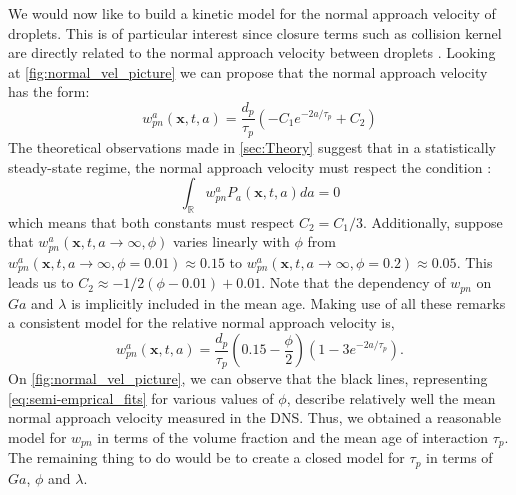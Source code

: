We would now like to build a kinetic model for the normal approach velocity of droplets. 
This is of particular interest since closure terms such as collision kernel are directly related to the normal approach velocity between droplets \citep{sundaram1997collision}.
Looking at \ref{fig:normal_vel_picture} we can propose that the normal approach velocity has the form:
\begin{equation}
    w_{pn}^a(\textbf{x},t,a) = \frac{d_p}{\tau_p} \left(
        - C_1 e^{- 2 a/\tau_p }
        + C_2
    \right)
\end{equation}
The theoretical observations made in \ref{sec:Theory} suggest that in a statistically steady-state regime, the normal approach velocity must respect the condition :
\begin{equation}
\int_\mathbb{R} w_{pn}^aP_a(\textbf{x},t,a) da = 0 
\end{equation}
which means that both constants must respect $C_2 = C_1 /3$. 
Additionally, suppose that $w_{pn}^a(\textbf{x},t,a\to\infty,\phi)$ varies linearly with $\phi$ from $w_{pn}^a(\textbf{x},t,a\to\infty,\phi = 0.01) \approx 0.15$ to $w_{pn}^a(\textbf{x},t,a\to\infty,\phi = 0.2) \approx 0.05$. 
This leads us to $C_2 \approx -1/2 (\phi - 0.01) + 0.01$. 
Note that the dependency of $w_{pn}$ on $Ga$ and $\lambda$ is implicitly included in the mean age.
Making use of all these remarks a consistent model for the relative normal approach velocity is, 
\begin{equation}
    w_{pn}^a(\textbf{x},t,a) = \frac{d_p}{\tau_p} 
    \left(
        0.15
        -\frac{\phi}{2}
    \right)\left(
        1 - 3e^{-2a/\tau_p}
    \right).
   \label{eq:semi-emprical_fits}
\end{equation}
On \ref{fig:normal_vel_picture}, we can observe that the black lines, representing \ref{eq:semi-emprical_fits} for various values of $\phi$, describe relatively well the mean normal approach velocity measured in the DNS. 
Thus, we obtained a reasonable model for $w_{pn}$ in terms of the volume fraction and the mean age of interaction $\tau_p$.
The remaining thing to do would be to create a closed model for $\tau_p$ in terms of $Ga$, $\phi$ and $\lambda$. 
